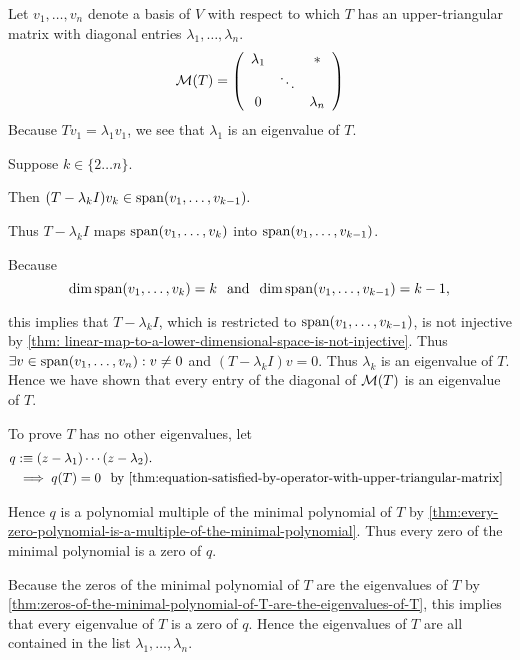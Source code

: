 \begin{prf}
  Let $v_1, \ldots, v_n$ denote a basis of $V$ with respect to which $T$ has an upper-triangular matrix with diagonal entries $\lambda_1, \ldots, \lambda_n$.
  \begin{equation}
    \mathcal{M}(T) =
    \left( {\begin{array}{ccc}
        \lambda_1 &         &  * \\
                  &  \ddots &    \\
           0      &         & \lambda_n
    \end{array} } \right)
  \end{equation}  
  Because $T v_1 = \lambda_1 v_1$, we see that $\lambda_1$ is an eigenvalue of $T$.
  
  Suppose $k \in \{2 \ldots n\}.$ 
  
  Then $(T-\lambda_k I) v_k \in \operatorname{span} (v_1, \ldots, v_{k-1}).$ 
  
  Thus $T-\lambda_k I$ maps $\operatorname{span} (v_1, \ldots, v_k)$ into $\operatorname{span} (v_1, \ldots, v_{k-1})$.
  
  Because
  \begin{equation}
    \dim \operatorname{span} (v_1, \ldots, v_k) = k \;\;\, \text{and}\;\; \dim \operatorname{span} (v_1, \ldots, v_{k-1}) = k-1,
  \end{equation}
  
  this implies that $T-\lambda_k I$, which is restricted to $\operatorname{span} (v_1, \ldots, v_{k-1})$, is not injective by \autoref{thm: linear-map-to-a-lower-dimensional-space-is-not-injective}. Thus $\exists v \in \operatorname{span} (v_1, \ldots, v_n): v\neq0$ and $(T-\lambda_k I)v=0$. Thus $\lambda_k$ is an eigenvalue of $T$. Hence we have shown that every entry of the diagonal of $\mathcal{M}(T)$ is an eigenvalue of $T$.
  
  To prove $T$ has no other eigenvalues, let
  \begin{equation}
    \begin{aligned}
      q &:\equiv (z-\lambda_1) \cdots (z-\lambda_2). \\
      &\implies q(T) = 0 \mytext{by \autoref{thm:equation-satisfied-by-operator-with-upper-triangular-matrix}}
    \end{aligned}
  \end{equation}
  
  Hence $q$ is a polynomial multiple of the minimal polynomial of $T$ by \autoref{thm:every-zero-polynomial-is-a-multiple-of-the-minimal-polynomial}. Thus every zero of the minimal polynomial is a zero of $q$.
  
  Because the zeros of the minimal polynomial of $T$ are the eigenvalues of $T$ by \autoref{thm:zeros-of-the-minimal-polynomial-of-T-are-the-eigenvalues-of-T}, this implies that every eigenvalue of $T$ is a zero of $q$. Hence the eigenvalues of $T$ are all contained in the list $\lambda_1, \ldots, \lambda_n$.
  
\end{prf}


